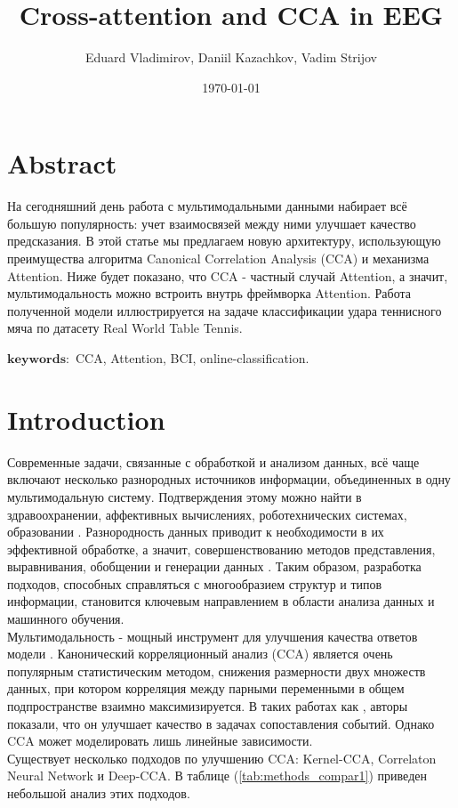 \documentclass[a4paper,14pt]{article}
\author{Eduard Vladimirov, Daniil Kazachkov, Vadim Strijov}
\title{\textbf{Cross-attention and CCA in EEG}}
\date{\today}
\theoremstyle{plain} %
\theoremstyle{definition} %
\theoremstyle{remark} %
\begin{document}
	\maketitle
	
	\section{Abstract}
        На сегодняшний день работа с мультимодальными данными набирает всё большую популярность: учет взаимосвязей между ними улучшает качество предсказания. В этой статье мы предлагаем новую архитектуру, использующую преимущества алгоритма Canonical Correlation Analysis (CCA) и механизма Attention. Ниже будет показано, что CCA - частный случай Attention, а значит, мультимодальность можно встроить внутрь фреймворка Attention. Работа полученной модели иллюстрируется на задаче классификации удара теннисного мяча по датасету Real World Table Tennis. 

        $\mathbf{keywords:}$ CCA, Attention, BCI, online-classification.

        \section{Introduction}
        Современные задачи, связанные с обработкой и анализом данных, всё чаще включают несколько разнородных источников информации, объединенных в одну мультимодальную систему. Подтверждения этому можно найти в здравоохранении, аффективных вычислениях, роботехнических системах, образовании \citep{paulpu2020foundation}. Разнородность данных приводит к необходимости в их эффективной обработке, а значит, совершенствованию методов представления, выравнивания, обобщении и генерации данных \citep{paulpu2020foundation}. Таким образом, разработка подходов, способных справляться с многообразием структур и типов информации, становится ключевым направлением в области анализа данных и машинного обучения. \\
        Мультимодальность - мощный инструмент для улучшения качества ответов модели \citep{huang2021whatmakes}. Канонический корреляционный анализ (CCA) \citep{yang2021surveycca} является очень популярным статистическим методом, снижения размерности двух множеств данных, при котором корреляция между парными переменными в общем подпространстве взаимно максимизируется. В таких работах как \citep{chandar2016corrnet}, \citep{bayoudh2022surveydmlcv} авторы показали, что он улучшает качество в задачах сопоставления событий. Однако CCA может моделировать лишь линейные зависимости. \\
        Существует несколько подходов по улучшению CCA: Kernel-CCA, Correlaton Neural Network и Deep-CCA. В таблице (\ref{tab:methods_compar1}) приведен небольшой анализ этих подходов.
        
\end{document}

